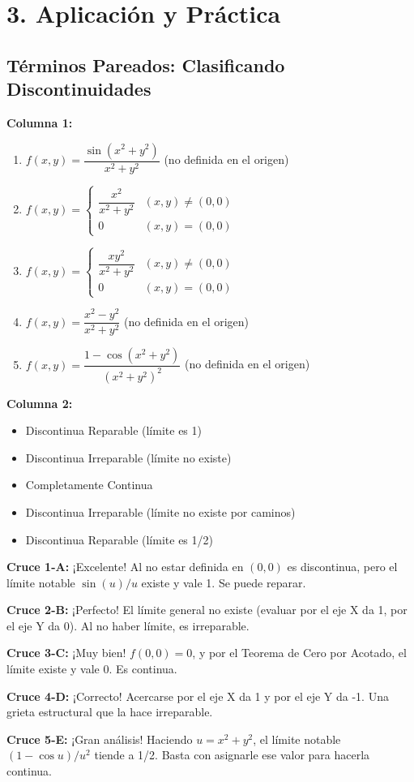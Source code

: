 \documentclass[11pt]{article}
\newenvironment{aplicacion}{%
  \section*{3. Aplicación y Práctica}%
}{}
\newenvironment{pareados}[1]{\subsection*{Términos Pareados: #1}}{\vspace{0.3cm}}
\newcommand{\columnaI}[1]{\textbf{Columna 1:}\begin{enumerate}#1\end{enumerate}}
\newcommand{\columnaII}[1]{\textbf{Columna 2:}\begin{itemize}#1\end{itemize}}
\newcommand{\pareo}[2]{\textbf{Cruce #1:} #2\par}
\begin{document}
\begin{aplicacion}
\begin{pareados}{Clasificando Discontinuidades}
    \columnaI{
      \item $\displaystyle f(x,y) = \dfrac{\sin(x^2+y^2)}{x^2+y^2}$ (no definida en el origen)
      \item $\displaystyle f(x,y) = \begin{cases} \dfrac{x^2}{x^2+y^2} & (x,y) \neq (0,0) \\ 0 & (x,y) = (0,0) \end{cases}$
      \item $\displaystyle f(x,y) = \begin{cases} \dfrac{xy^2}{x^2+y^2} & (x,y) \neq (0,0) \\ 0 & (x,y) = (0,0) \end{cases}$
      \item $\displaystyle f(x,y) = \dfrac{x^2-y^2}{x^2+y^2}$ (no definida en el origen)
      \item $\displaystyle f(x,y) = \dfrac{1-\cos(x^2+y^2)}{(x^2+y^2)^2}$ (no definida en el origen)
    }
    
    \columnaII{
      \item Discontinua Reparable (límite es 1)
      \item Discontinua Irreparable (límite no existe)
      \item Completamente Continua
      \item Discontinua Irreparable (límite no existe por caminos)
      \item Discontinua Reparable (límite es 1/2)
    }

    \pareo{1-A}{¡Excelente! Al no estar definida en $(0,0)$ es discontinua, pero el límite notable $\sin(u)/u$ existe y vale 1. Se puede reparar.}
    \pareo{2-B}{¡Perfecto! El límite general no existe (evaluar por el eje X da 1, por el eje Y da 0). Al no haber límite, es irreparable.}
    \pareo{3-C}{¡Muy bien! $f(0,0) = 0$, y por el Teorema de Cero por Acotado, el límite existe y vale $0$. Es continua.}
    \pareo{4-D}{¡Correcto! Acercarse por el eje X da 1 y por el eje Y da -1. Una grieta estructural que la hace irreparable.}
    \pareo{5-E}{¡Gran análisis! Haciendo $u=x^2+y^2$, el límite notable $(1-\cos u)/u^2$ tiende a 1/2. Basta con asignarle ese valor para hacerla continua.}
  \end{pareados}

\end{aplicacion}
\end{document}
